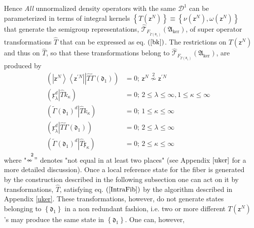 \documentclass[aps,preprint]{revtex4}%
\begin{document}
Hence \emph{All} unnormalized density operators with the same $\mathcal{D}%
^{1}$ can be parameterized in terms of integral kernels $\left\{  T\left(
\mathsf{z}^{N}\right)  \right\}  \equiv\left\{  \nu\left(  \mathsf{z}%
^{N}\right)  ,\omega\left(  \mathsf{z}^{N}\right)  \right\}  $ that generate
the semigroup representations, $\mathcal{\hat{T}}_{F_{\tilde{\Gamma}\left(
\mathfrak{d}_{1}\right)  }}\left(  \mathfrak{A}_{\ker}\right)  $, of super
operator transformations $\hat{T}$ that can be expressed as eq. $\left(
\ref{bk}\right)  $. The restrictions on $T\left(  \mathsf{z}^{N}\right)  $ and
thus on $\hat{T}$, so that these transformations belong to $\mathcal{\hat{T}%
}_{F_{\tilde{\Gamma}\left(  \mathfrak{d}_{1}\right)  }}\left(  \mathfrak{A}%
_{\ker}\right)  $, are produced by%
\begin{align}
\left(  \left\vert \mathsf{z}^{N}\right\rangle \left\langle \mathsf{z}^{\prime
N}\right\vert \left\vert \hat{T}\right.  \tilde{\Gamma}\left(  \mathfrak{d}%
_{1}\right)  \right)   &  =0;\,\mathsf{z}^{N}\overset{2}{\nsim}\mathsf{z}%
^{\prime N}\nonumber\\
\left(  \mathfrak{x}_{\lambda}^{d}\left\vert \hat{T}\right.  k_{\kappa
}\right)   &  =0;\,2\leq\lambda\leq\infty,1\leq\kappa\leq\infty\nonumber\\
\left(  \tilde{\Gamma}\left(  \mathfrak{d}_{1}\right)  ^{d}\left\vert \hat
{T}\right.  k_{\kappa}\right)   &  =0;\,1\leq\kappa\leq\infty\nonumber\\
\left(  \mathfrak{x}_{\lambda}^{d}\left\vert \hat{T}\right.  \tilde{\Gamma
}\left(  \mathfrak{d}_{1}\right)  \right)   &  =0;\,2\leq\lambda\leq
\infty\nonumber\\
\left(  \tilde{\Gamma}\left(  \mathfrak{d}_{1}\right)  ^{d}\left\vert \hat
{T}\right.  \mathfrak{x}_{\kappa}\right)   &  =0;\,2\leq\kappa\leq
\infty\label{IntraFib}%
\end{align}
where "$\overset{2}{\nsim"}$ denotes "not equal in at least two places" (see
Appendix $\ref{uker}$ for a more detailed discussion). Once a local reference
state for the fiber is generated by the construction described in the
following subsection one can act on it by transformations, $\hat{T}$,
satisfying eq. $\left(  \ref{IntraFib}\right)  $ by the algorithm described in
Appendix \ref{uker}. These transformations, however, do not generate states
belonging to $\left\{  \mathfrak{d}_{1}\right\}  $ in a non redundant fashion,
i.e. two or more different $T\left(  \mathsf{z}^{N}\right)  $'s may produce
the same state in $\left\{  \mathfrak{d}_{1}\right\}  $. One can, however,
\end{document}
